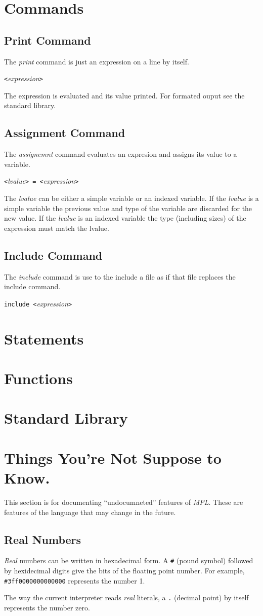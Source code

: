 \documentclass{article}
\begin{document}
\section{Commands}
\subsection{Print Command}
The \emph{print} command is just an expression on a line by itself.
\begin{center}
  \verb|<|\emph{expression}\verb|>|
\end{center}
The expression is evaluated and its value printed.
For formated ouput see the standard library.
\subsection{Assignment Command}
The \emph{assignemnt} command evaluates an expresion and
assigns its value to a variable.
\begin{center}
  \verb|<|\emph{lvalue}\verb|> = <|\emph{expression}\verb|>|
\end{center}
The \emph{lvalue} can be either a simple variable or an indexed variable.
If the \emph{lvalue} is a simple variable the previous value and
type of the variable are discarded for the new value.
If the \emph{lvalue} is an indexed variable the type (including sizes)
of the expression must match the lvalue.
\subsection{Include Command}
The \emph{include} command is use to the include a file as if
that file replaces the include command.
\begin{center}
  \verb|include <|\emph{expression}\verb|>|
\end{center}
\section{Statements}
\section{Functions}
\section{Standard Library}
\section{Things You're Not Suppose to Know.}
This section is for documenting ``undocumneted'' features of \emph{MPL}.
These are features of the language that may change in the future.
\subsection{Real Numbers}
\emph{Real} numbers can be written in hexadecimal form.
A \verb|#| (pound symbol) followed by hexidecimal digits give the bits
of the floating point number. For example, \verb|#3ff0000000000000|
represents the number 1.

The way the current interpreter reads \emph{real} literals,
a \verb|.| (decimal point) by itself represents the number
zero.
\end{document}
